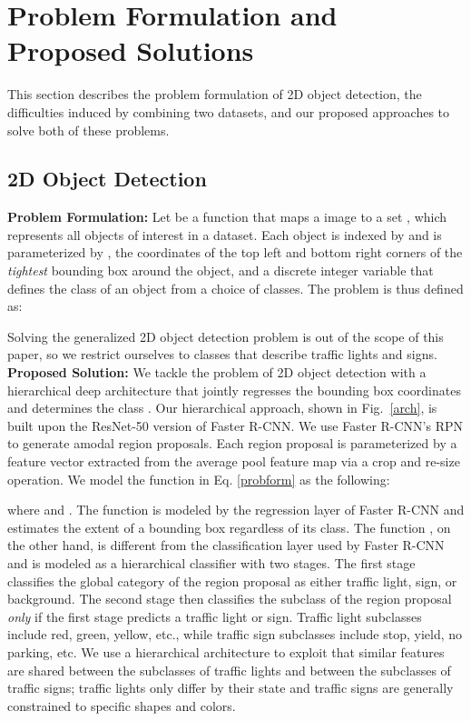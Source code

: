 \documentclass[10pt, conference, compsocconf]{IEEEtran}
\newcommand{\fig}[1]{Fig.~\ref{#1}}
\begin{document}
\section{Problem Formulation and Proposed Solutions} \label{prob_form}
This section describes the problem formulation of 2D object detection, the difficulties induced by combining two datasets, and our proposed approaches to solve both of these problems.

\subsection{2D Object Detection}
\noindent\textbf{Problem Formulation:} 
Let  be a function that maps a  image  to a set , which represents all objects of interest in a dataset. Each object  is indexed by  and is parameterized by , the coordinates of the top left and bottom right corners of the \textit{tightest} bounding box around the object, and  a discrete integer variable that defines the class of an object from a choice of  classes.
The problem is thus defined as:   

Solving the generalized 2D object detection problem is out of the scope of this paper, so we restrict ourselves to  classes that describe traffic lights and signs.
\\

\noindent\textbf{Proposed Solution:} 
We tackle the problem of 2D object detection with a hierarchical deep architecture that jointly regresses the bounding box coordinates  and determines the class . Our hierarchical approach, shown in \fig{arch}, is built upon the ResNet-50 \cite{He} version of Faster R-CNN. We use Faster R-CNN's RPN to generate  amodal region proposals. Each region proposal is parameterized by a feature vector  extracted from the average pool feature map via a crop and re-size operation. We model the function in Eq. \ref{probform} as the following:


where  and . The function  is modeled by the regression layer of Faster R-CNN and estimates the extent of a bounding box regardless of its class. The function , on the other hand, is different from the classification layer used by Faster R-CNN and is modeled as a hierarchical classifier with two stages. The first stage classifies the global category of the region proposal as either traffic light, sign, or background. The second stage then classifies the subclass of the region proposal \textit{only} if the first stage predicts a traffic light or sign. Traffic light subclasses include red, green, yellow, etc., while traffic sign subclasses include stop, yield, no parking, etc. We use a hierarchical architecture to exploit that similar features are shared between the subclasses of traffic lights and between the subclasses of traffic signs; traffic lights only differ by their state and traffic signs are generally constrained to specific shapes and colors. \\
\end{document}
